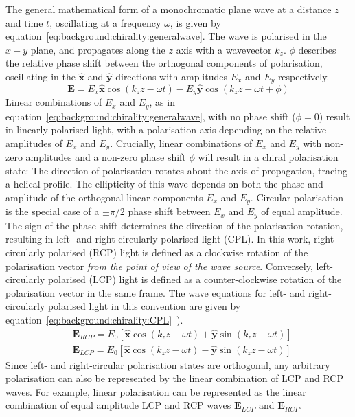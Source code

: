 The general mathematical form of a monochromatic plane wave at a distance $z$ and time $t$, oscillating at a frequency $\omega$, is given by equation~\ref{eq:background:chirality:generalwave}. The wave is polarised in the $x-y$ plane, and propagates along the $z$ axis with a wavevector $k_z$. $\phi$ describes the relative phase shift between the orthogonal components of polarisation, oscillating in the $\mathbf{\hat{x}}$ and $\mathbf{\hat{y}}$ directions with amplitudes $E_x$ and $E_y$ respectively.
\begin{equation} \label{eq:background:chirality:generalwave}
    \mathbf{E}= E_x  \mathbf{\hat{x}} \cos(k_z z-\omega t) - E_y \mathbf{\hat{y}} \cos(k_z z-\omega t +\phi)
\end{equation}
Linear combinations of $E_x$ and $E_y$, as in equation~\ref{eq:background:chirality:generalwave}, with no phase shift ($\phi=0$) result in linearly polarised light, with a polarisation axis depending on the relative amplitudes of $E_x$ and $E_y$. Crucially, linear combinations of $E_x$ and $E_y$ with non-zero amplitudes and a non-zero phase shift $\phi$ will result in a chiral polarisation state: The direction of polarisation rotates about the axis of propagation, tracing a helical profile. The ellipticity of this wave depends on both the phase and amplitude of the orthogonal linear components $E_x$ and $E_y$. Circular polarisation is the special case of a $\pm \pi/2$ phase shift between $E_x$ and $E_y$ of equal amplitude. The sign of the phase shift determines the direction of the polarisation rotation, resulting in left- and right-circularly polarised light (CPL). In this work, right-circularly polarised (RCP) light is defined as a clockwise rotation of the polarisation vector \textit{from the point of view of the wave source}. Conversely, left-circularly polarised (LCP) light is defined as a counter-clockwise rotation of the polarisation vector in the same frame. The wave equations for left- and right-circularly polarised light in this convention are given by equation~\ref{eq:background:chirality:CPL}~\cite[\S 8.1.2]{Hecht2013}). 
\begin{equation} \label{eq:background:chirality:CPL}
    \begin{split}
        & \mathbf{E}_{RCP} = E_0 \left[ \mathbf{\hat{x}} \cos(k_z z-\omega t) + \mathbf{\hat{y}} \sin(k_z z-\omega t )\right]\\
        & \mathbf{E}_{LCP}= E_0 \left[ \mathbf{\hat{x}} \cos(k_z z-\omega t) - \mathbf{\hat{y}} \sin(k_z z-\omega t )\right]
    \end{split}
\end{equation}
Since left- and right-circular polarisation states are orthogonal, any arbitrary polarisation can also be represented by the linear combination of LCP and RCP waves. For example, linear polarisation can be represented as the linear combination of equal amplitude LCP and RCP waves $\mathbf{E}_{LCP}$ and $\mathbf{E}_{RCP}$. 

